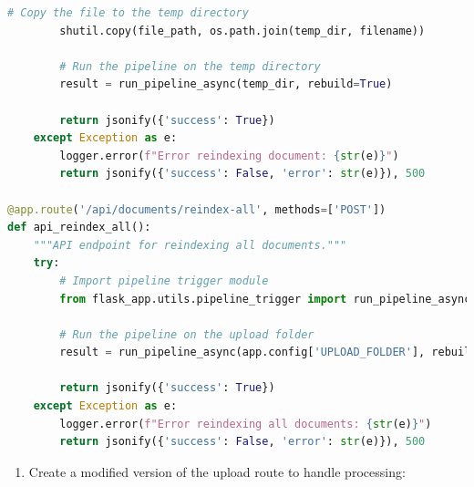 \documentclass[
  screen,review,acmlarge]{acmart}
\providecommand{\tightlist}{%
  \setlength{\itemsep}{0pt}\setlength{\parskip}{0pt}}
\begin{document}
\begin{lstlisting}[language=Python]
        # Copy the file to the temp directory
        shutil.copy(file_path, os.path.join(temp_dir, filename))
        
        # Run the pipeline on the temp directory
        result = run_pipeline_async(temp_dir, rebuild=True)
        
        return jsonify({'success': True})
    except Exception as e:
        logger.error(f"Error reindexing document: {str(e)}")
        return jsonify({'success': False, 'error': str(e)}), 500

@app.route('/api/documents/reindex-all', methods=['POST'])
def api_reindex_all():
    """API endpoint for reindexing all documents."""
    try:
        # Import pipeline trigger module
        from flask_app.utils.pipeline_trigger import run_pipeline_async
        
        # Run the pipeline on the upload folder
        result = run_pipeline_async(app.config['UPLOAD_FOLDER'], rebuild=True)
        
        return jsonify({'success': True})
    except Exception as e:
        logger.error(f"Error reindexing all documents: {str(e)}")
        return jsonify({'success': False, 'error': str(e)}), 500
\end{lstlisting}

\begin{enumerate}
\def\labelenumi{\arabic{enumi}.}
\setcounter{enumi}{1}
\tightlist
\item
  Create a modified version of the upload route to handle processing:
\end{enumerate}
\end{document}

